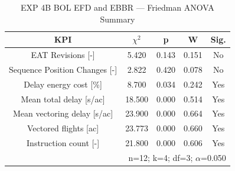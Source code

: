 \begin{table}[!t]
\caption{EXP 4B BOL EFD and EBBR — Friedman ANOVA Summary}
\begin{center}
\footnotesize
\setlength{\tabcolsep}{3pt}
\renewcommand{\arraystretch}{1.000}
\begin{tabular}{|c|c|c|c|c|}
\hline
\textbf{KPI} & \textbf{$\chi^2$} & \textbf{p} & \textbf{W} & \textbf{Sig.} \\
\hline
EAT Revisions [-] & 5.420 & 0.143 & 0.151 & No \\
\hline
Sequence Position Changes [-] & 2.822 & 0.420 & 0.078 & No \\
\hline
Delay energy cost [\%] & 8.700 & 0.034 & 0.242 & Yes \\
\hline
Mean total delay [s/ac] & 18.500 & 0.000 & 0.514 & Yes \\
\hline
Mean vectoring delay [s/ac] & 23.900 & 0.000 & 0.664 & Yes \\
\hline
Vectored flights [ac] & 23.773 & 0.000 & 0.660 & Yes \\
\hline
Instruction count [-] & 21.800 & 0.000 & 0.606 & Yes \\
\hline
\multicolumn{5}{r}{n=12; k=4; df=3; $\alpha$=0.050}\\
\end{tabular}
\label{tab:exp\_4b\_bol\_efd\_and\_ebbr\_friedman}
\end{center}
\end{table}